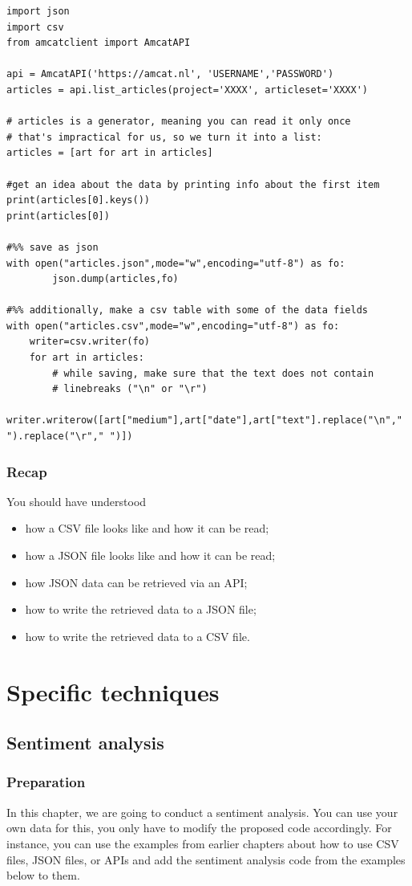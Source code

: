 \documentclass[a4paper,12pt]{book}
\begin{document}
\begin{lstlisting}
import json
import csv
from amcatclient import AmcatAPI

api = AmcatAPI('https://amcat.nl', 'USERNAME','PASSWORD')
articles = api.list_articles(project='XXXX', articleset='XXXX')

# articles is a generator, meaning you can read it only once
# that's impractical for us, so we turn it into a list:
articles = [art for art in articles]

#get an idea about the data by printing info about the first item
print(articles[0].keys())
print(articles[0])

#%% save as json
with open("articles.json",mode="w",encoding="utf-8") as fo:
        json.dump(articles,fo)
 
#%% additionally, make a csv table with some of the data fields
with open("articles.csv",mode="w",encoding="utf-8") as fo:
    writer=csv.writer(fo)
    for art in articles:
        # while saving, make sure that the text does not contain 
        # linebreaks ("\n" or "\r")
        writer.writerow([art["medium"],art["date"],art["text"].replace("\n"," ").replace("\r"," ")]) 
\end{lstlisting}




\section{Recap}
You should have understood 
\begin{itemize}
\item how a CSV file looks like and how it can be read;
\item how a JSON file looks like and how it can be read;
\item how JSON data can be retrieved via an API;
\item how to write the retrieved data to a JSON file;
\item how to write the retrieved data to a CSV file.
\end{itemize}


\part{Specific techniques}
\label{part:specific}

\chapter{Sentiment analysis}
\section{Preparation}
In this chapter, we are going to conduct a sentiment analysis. You can use your own data for this, you only have to modify the proposed code accordingly. For instance, you can use the examples from earlier chapters about how to use CSV files, JSON files, or APIs and add the sentiment analysis code from the examples below to them.
\end{document}
